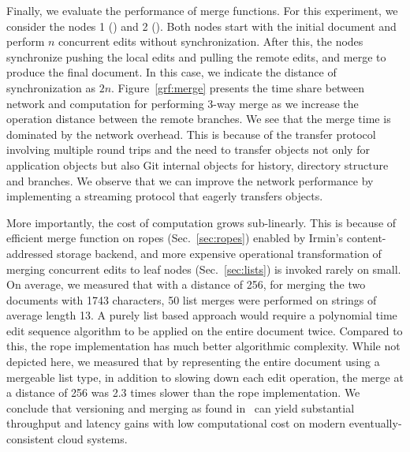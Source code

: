 Finally, we evaluate the performance of merge functions. For this experiment,
we consider the nodes 1 () and 2 (). Both
nodes start with the initial document and perform $n$ concurrent edits
without synchronization. After this, the nodes synchronize pushing the local
edits and pulling the remote edits, and merge to produce the final document. In
this case, we indicate the distance of synchronization as $2n$.
Figure~\ref{grf:merge} presents the time share between network and computation
for performing 3-way merge as we increase the operation distance between the
remote branches. We see that the merge time is dominated by the network
overhead. This is because of the transfer protocol involving multiple
round trips and the need to transfer objects not only for application objects
but also Git internal objects for history, directory structure and branches. We
observe that we can improve the network performance by implementing a streaming
protocol that eagerly transfers objects.

More importantly, the cost of computation grows sub-linearly. This is
because of efficient merge function on ropes (Sec.~\ref{sec:ropes})
enabled by Irmin's content-addressed storage backend, and more
expensive operational transformation of merging concurrent edits to
leaf nodes (Sec.~\ref{sec:lists}) is invoked rarely on small. On
average, we measured that with a distance of 256, for merging the two
documents with 1743 characters, 50 list merges were performed on
strings of average length 13. A purely list based approach would
require a polynomial time edit sequence algorithm to be applied on the
entire document twice. Compared to this, the rope implementation has
much better algorithmic complexity.  While not depicted here, we
measured that by representing the entire document using a mergeable
list type, in addition to slowing down each edit operation, the merge
at a distance of 256 was 2.3 times slower than the rope
implementation.  We conclude that versioning and merging as found in
\name\ can yield substantial throughput and latency gains with low
computational cost on modern eventually-consistent cloud systems.
